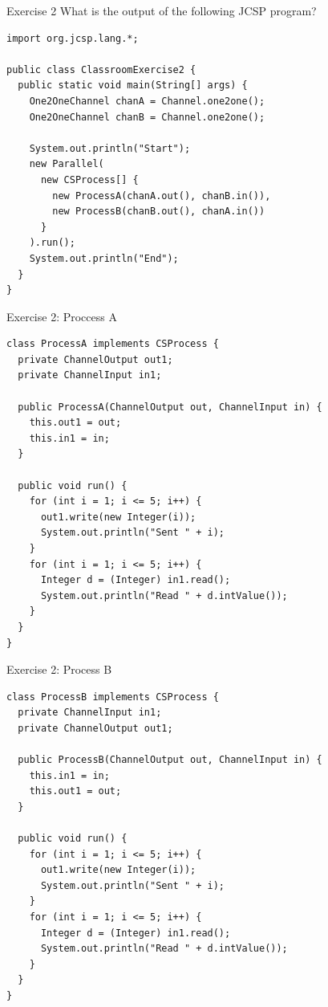 \begin{frame}[fragile]{Exercise 2}
  What is the output of the following JCSP program?


\begin{lstlisting}[basicstyle=\fontsize{9}{11}\selectfont\ttfamily]
import org.jcsp.lang.*;

public class ClassroomExercise2 {
  public static void main(String[] args) {
    One2OneChannel chanA = Channel.one2one();
    One2OneChannel chanB = Channel.one2one();

    System.out.println("Start");
    new Parallel(
      new CSProcess[] { 
        new ProcessA(chanA.out(), chanB.in()),
        new ProcessB(chanB.out(), chanA.in()) 
      }
    ).run();
    System.out.println("End");
  }
}
\end{lstlisting}
\end{frame}

\begin{frame}[fragile]{Exercise 2: Proccess A}
\begin{lstlisting}[basicstyle=\fontsize{9}{11}\selectfont\ttfamily]
class ProcessA implements CSProcess {
  private ChannelOutput out1;
  private ChannelInput in1;

  public ProcessA(ChannelOutput out, ChannelInput in) {
    this.out1 = out;
    this.in1 = in;
  }

  public void run() {
    for (int i = 1; i <= 5; i++) {
      out1.write(new Integer(i));
      System.out.println("Sent " + i);
    }
    for (int i = 1; i <= 5; i++) {
      Integer d = (Integer) in1.read();
      System.out.println("Read " + d.intValue());
    }
  }
}
\end{lstlisting}
\end{frame}

\begin{frame}[fragile]{Exercise 2: Process B}
\begin{lstlisting}[basicstyle=\fontsize{9}{11}\selectfont\ttfamily]
class ProcessB implements CSProcess {
  private ChannelInput in1;
  private ChannelOutput out1;

  public ProcessB(ChannelOutput out, ChannelInput in) {
    this.in1 = in;
    this.out1 = out;
  }

  public void run() {
    for (int i = 1; i <= 5; i++) {
      out1.write(new Integer(i));
      System.out.println("Sent " + i);
    }
    for (int i = 1; i <= 5; i++) {
      Integer d = (Integer) in1.read();
      System.out.println("Read " + d.intValue());
    }
  }
}
\end{lstlisting}
\end{frame}

